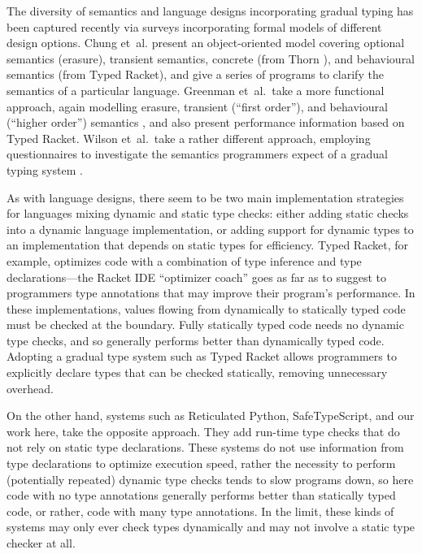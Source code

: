 The diversity of semantics and language designs incorporating
gradual typing has been captured recently via surveys
incorporating formal models of different design options.
Chung et~al.\citep{kafka18} present an object-oriented model covering optional
semantics (erasure),  transient semantics, concrete (from Thorn
\cite{Bloom2009}), and behavioural semantics (from Typed Racket), and
give a series of programs to clarify the semantics of a
particular language.  
Greenman et~al.\ take a more functional approach, again modelling
erasure, transient (``first order''), and behavioural (``higher
order'') semantics \cite{bensurvey18icfp}, and also present
performance information based on Typed Racket.
Wilson et~al.\ take a rather different approach, employing
questionnaires to investigate the semantics programmers expect of a
gradual typing system  \cite{shriramdls18}.

As with language designs, there seem to be two main implementation
strategies for languages mixing dynamic and static type checks: either
adding static checks into a dynamic language implementation, or adding
support for dynamic types to an implementation that depends on
static types for efficiency. Typed Racket, for example, optimizes code with
a combination of type inference and type declarations---the Racket
IDE ``optimizer coach'' goes as far as to suggest to programmers type
annotations that may improve their program's performance\citep{optimizerCoach2012}. In these implementations, values flowing
from dynamically to statically typed code must be checked at the
boundary.  Fully statically typed code needs no dynamic type checks,
and so generally performs better than dynamically typed code. Adopting
a gradual type system such as Typed Racket\citep{typedScheme08} allows
programmers to explicitly declare types that can be checked statically,
removing unnecessary overhead.

On the other hand, systems such as Reticulated Python\citep{reticPython2014}, SafeTypeScript\citep{Richards2017}, and our
work here, take the opposite approach.
They add run-time type checks that do not rely on static
type declarations. These systems do not use information from type
declarations to optimize execution speed, rather the necessity to
perform (potentially repeated) dynamic type checks tends to slow
programs down, so here code with no type annotations generally
performs better than statically typed code, or rather, code with many
type annotations. In the limit, these kinds of systems may only ever
check types dynamically and may not involve a static type checker at
all. 

